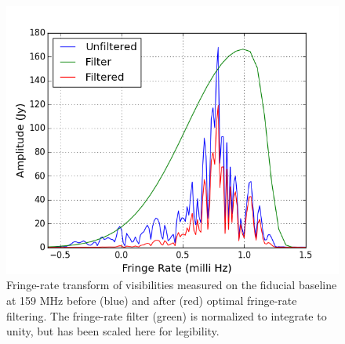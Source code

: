 \documentclass[twocolumn,numberedappendix]{emulateapj} \shorttitle{PSA64}
\begin{document}
\begin{figure}\centering
\includegraphics[width=\columnwidth]{plots/fr_preserved_signal.png}
\caption{
Fringe-rate transform of visibilities measured on the fiducial baseline at 159 MHz before (blue) and
after (red) optimal fringe-rate filtering. The fringe-rate filter (green) is normalized
to integrate to unity, but has been scaled here for legibility.
}
\label{fig:fr_preserved_signal}
\end{figure}
\end{document}
